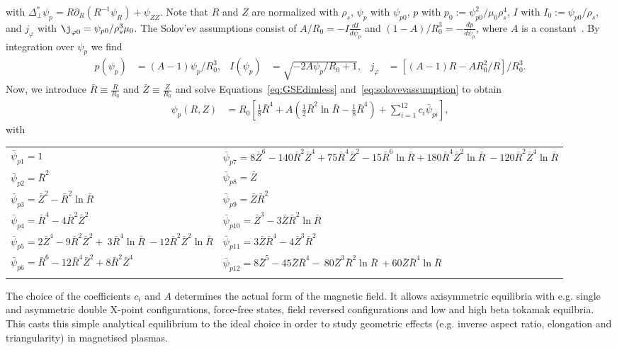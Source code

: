 with $\Delta^*_\perp \psi_p = R\partial_R (R^{-1}\psi_R) + \psi_{ZZ}$.
Note that $R$ and $Z$ are normalized
with $\rho_s$, $\psi_p$ with $\psi_{p0}$, $p$ with
$p_0 := \psi_{p0}^2/\mu_0\rho_s^4$, $I$ with $I_0:=\psi_{p0}/\rho_s$,
and $j_\varphi$ with $\j_{\varphi 0} = \psi_{p0}/\rho_s^3\mu_0$.
The Solov'ev assumptions consist of \(A/R_0 = -I \frac{d I}{d  \psi_p }\) and \((1-A)/R_0^3 = -\frac{d p}{d  \psi_p }\), where \(A\) is a constant~\cite{Cerfon2010,Cerfon2014}.
By integration over \(\psi_p\) we find
\begin{align}\label{eq:solovevassumption}
 p(\psi_p) &= (A-1)\psi_p/R_0^3,  &
 I(\psi_p) &= \sqrt{-2 A \psi_p/R_0 + 1}, &
 j_\varphi &= \left[(A-1)R - A R_0^2 / R\right]/R_0^3.
\end{align}
Now, we introduce \(\bar{R} \equiv \frac{R}{R_0}\) and \(\bar{Z} \equiv\frac{Z}{R_0}\)
and solve Equations~\eqref{eq:GSEdimless} and~\eqref{eq:solovevassumption} to obtain
\begin{align}\label{eq:solovev}
 \psi_p (R,Z) &= R_0 \left[ \frac{1}{8}\bar{R}^4 + A\left( \frac{1}{2} \bar{R}^2 \ln{\bar{R}} 
   - \frac{1}{8}\bar{R}^4\right) + \sum_{i=1}^{12} c_{i}  \bar{\psi}_{pi}\right],
\end{align}
with
\begin{longtable}{>{\RaggedRight}p{7cm}>{\RaggedRight}p{7cm}}
\toprule
  $\bar{\psi}_{p1}=1$
  & $\bar{\psi}_{p7}=8\bar{Z}^6 -140 \bar{R}^2 \bar{Z}^4
                      + 75 \bar{R}^4 \bar{Z}^2 - 15\bar{R}^6\ln{\bar{R}}+ 180 \bar{R}^4 \bar{Z}^2 \ln{\bar{R}} \
                       -120 \bar{R}^2 \bar{Z}^4 \ln{\bar{R}}$\\
%
  $\bar{\psi}_{p2}=\bar{R}^2$ &
  $\bar{\psi}_{p8}=\bar{Z}$ \\
%
  $\bar{\psi}_{p3}=\bar{Z}^2 - \bar{R}^2 \ln{\bar{R}}$ &
  $\bar{\psi}_{p9}=\bar{Z}  \bar{R}^2$\\
%
  $\bar{\psi}_{p4}=\bar{R}^4 -4\bar{R}^2\bar{Z}^2$ &
  $\bar{\psi}_{p10}=\bar{Z}^3 - 3 \bar{Z} \bar{R}^2 \ln{\bar{R}}$\\
  $\bar{\psi}_{p5}=2\bar{Z}^4 - 9 \bar{R}^2\bar{Z}^2 + \
                     3 \bar{R}^4 \ln{\bar{R}} \
                    -12  \bar{R}^2\bar{Z}^2 \ln{\bar{R}}$
  &
$\bar{\psi}_{p11}=3 \bar{Z}\bar{R}^4 - 4\bar{Z}^3\bar{R}^2$\\
%
  $\bar{\psi}_{p6}=\bar{R}^6 -12 \bar{R}^4 \bar{Z}^2
                     + 8  \bar{R}^2 \bar{Z}^4$ &
  $\bar{\psi}_{p12}= 8 \bar{Z}^5 -45 \bar{Z} \bar{R}^4 - \
                       80 \bar{Z}^3 \bar{R}^2\ln{\bar{R}} \
                       +60 \bar{Z} \bar{R}^4\ln{\bar{R}}$ \\
   & \\
\bottomrule
\end{longtable}
The choice of the coefficients \(c_{i}\) and \(A\) determines the actual form of the magnetic field. It allows axisymmetric equilibria with e.g. single and asymmetric double X-point configurations, force-free states,
field reversed configurations and low and high beta tokamak equilbria. This casts this simple analytical equilibrium to the ideal choice in order to study geometric effects (e.g. inverse aspect ratio, elongation and triangularity) in magnetised plasmas.

